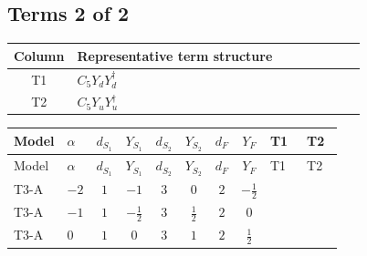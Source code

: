 \documentclass[8pt]{article}
\begin{document}
\begin{landscape}
\subsection*{Terms 2 of 2}
\begin{center}
\begin{tabular}{@{}c >{\raggedright\arraybackslash}p{0.82\linewidth}@{}}
\toprule
Column & Representative term structure \\
\midrule
T1 & \(\displaystyle C_{5} Y_d Y_d^\dagger\) \\
\midrule
T2 & \(\displaystyle C_{5} Y_u Y_u^\dagger\) \\
\midrule
\bottomrule
\end{tabular}
\end{center}
\smallskip
\tiny
\begin{longtable}{@{}llcccccc >{\raggedright\arraybackslash}p{0.21\linewidth} >{\raggedright\arraybackslash}p{0.21\linewidth}@{}}
\toprule
Model & $\alpha$ & $d_{S_1}$ & $Y_{S_1}$ & $d_{S_2}$ & $Y_{S_2}$ & $d_F$ & $Y_F$ & T1 & T2 \\
\midrule
\endfirsthead
\toprule
Model & $\alpha$ & $d_{S_1}$ & $Y_{S_1}$ & $d_{S_2}$ & $Y_{S_2}$ & $d_F$ & $Y_F$ & T1 & T2 \\
\midrule
\endhead
T3-A & $-2$ & $1$ & $-1$ & $3$ & $0$ & $2$ & $-\frac{1}{2}$ & \scriptsize\adjustbox{max width=\linewidth}{$\begin{gathered} 6 C_{5} Y_d Y_d^\dagger\end{gathered}$} & \scriptsize\adjustbox{max width=\linewidth}{$\begin{gathered} 6 C_{5} Y_u Y_u^\dagger\end{gathered}$} \\
\midrule
T3-A & $-1$ & $1$ & $-\frac{1}{2}$ & $3$ & $\frac{1}{2}$ & $2$ & $0$ & \scriptsize\adjustbox{max width=\linewidth}{$\begin{gathered} 6 C_{5} Y_d Y_d^\dagger\end{gathered}$} & \scriptsize\adjustbox{max width=\linewidth}{$\begin{gathered} 6 C_{5} Y_u Y_u^\dagger\end{gathered}$} \\
\midrule
T3-A & $0$ & $1$ & $0$ & $3$ & $1$ & $2$ & $\frac{1}{2}$ & \scriptsize\adjustbox{max width=\linewidth}{$\begin{gathered} 6 C_{5} Y_d Y_d^\dagger\end{gathered}$} & \scriptsize\adjustbox{max width=\linewidth}{$\begin{gathered} 6 C_{5} Y_u Y_u^\dagger\end{gathered}$} \\

\end{longtable}
\end{landscape}
\end{document}
